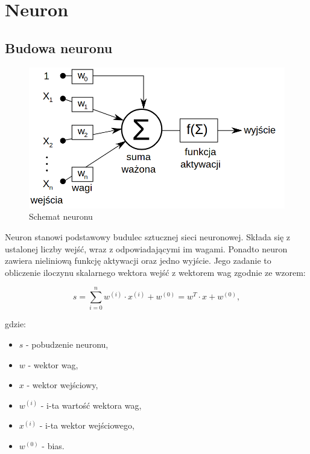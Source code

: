     \section{Neuron}\label{sec:neuron}

    \subsection{Budowa neuronu}\label{subsec:budowaNeuronu}

    \begin{figure}[htp]
        \centering
        \includegraphics[scale=0.4]{./img/neuron.png}
        \caption{Schemat neuronu}
    \end{figure}

    Neuron stanowi podstawowy budulec sztucznej sieci neuronowej.
    Składa się z ustalonej liczby wejść, wraz z odpowiadającymi im wagami.
    Ponadto neuron zawiera nieliniową funkcję aktywacji oraz jedno wyjście.
    Jego zadanie to obliczenie iloczynu skalarnego wektora wejść z wektorem wag zgodnie ze wzorem:

    \begin{equation}
        s = \sum _{i=0}^{n} {w^{(i)} \cdot x^{(i)}} + w^{(0)} = w^T \cdot x + w^{(0)},
        \label{neuron-eq1}
    \end{equation}

    gdzie:
    \begin{itemize}
        \item $s$ - pobudzenie neuronu,
        \item $w$ - wektor wag,
        \item $x$ - wektor wejściowy,
        \item $w^{(i)}$ - i-ta wartość wektora wag,
        \item $x^{(i)}$ - i-ta wektor wejściowego,
        \item $w^{(0)}$ - bias.
    \end{itemize}

